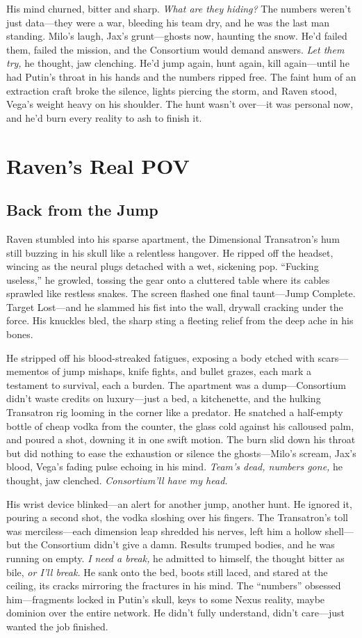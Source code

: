 \documentclass[12pt]{book}
\begin{document}
His mind churned, bitter and sharp. \textit{What are they hiding?} The numbers weren’t just data—they were a war, bleeding his team dry, and he was the last man standing. Milo’s laugh, Jax’s grunt—ghosts now, haunting the snow. He’d failed them, failed the mission, and the Consortium would demand answers. \textit{Let them try,} he thought, jaw clenching. He’d jump again, hunt again, kill again—until he had Putin’s throat in his hands and the numbers ripped free. The faint hum of an extraction craft broke the silence, lights piercing the storm, and Raven stood, Vega’s weight heavy on his shoulder. The hunt wasn’t over—it was personal now, and he’d burn every reality to ash to finish it.

\chapter{Raven’s Real POV}
\section{Back from the Jump}

Raven stumbled into his sparse apartment, the Dimensional Transatron’s hum still buzzing in his skull like a relentless hangover. He ripped off the headset, wincing as the neural plugs detached with a wet, sickening pop. ``Fucking useless,'' he growled, tossing the gear onto a cluttered table where its cables sprawled like restless snakes. The screen flashed one final taunt---Jump Complete. Target Lost---and he slammed his fist into the wall, drywall cracking under the force. His knuckles bled, the sharp sting a fleeting relief from the deep ache in his bones.

He stripped off his blood-streaked fatigues, exposing a body etched with scars---mementos of jump mishaps, knife fights, and bullet grazes, each mark a testament to survival, each a burden. The apartment was a dump---Consortium didn’t waste credits on luxury---just a bed, a kitchenette, and the hulking Transatron rig looming in the corner like a predator. He snatched a half-empty bottle of cheap vodka from the counter, the glass cold against his calloused palm, and poured a shot, downing it in one swift motion. The burn slid down his throat but did nothing to ease the exhaustion or silence the ghosts---Milo’s scream, Jax’s blood, Vega’s fading pulse echoing in his mind. \textit{Team’s dead, numbers gone,} he thought, jaw clenched. \textit{Consortium’ll have my head.}

His wrist device blinked---an alert for another jump, another hunt. He ignored it, pouring a second shot, the vodka sloshing over his fingers. The Transatron’s toll was merciless---each dimension leap shredded his nerves, left him a hollow shell---but the Consortium didn’t give a damn. Results trumped bodies, and he was running on empty. \textit{I need a break,} he admitted to himself, the thought bitter as bile, \textit{or I’ll break.} He sank onto the bed, boots still laced, and stared at the ceiling, its cracks mirroring the fractures in his mind. The ``numbers'' obsessed him---fragments locked in Putin’s skull, keys to some Nexus reality, maybe dominion over the entire network. He didn’t fully understand, didn’t care---just wanted the job finished.
\end{document}
